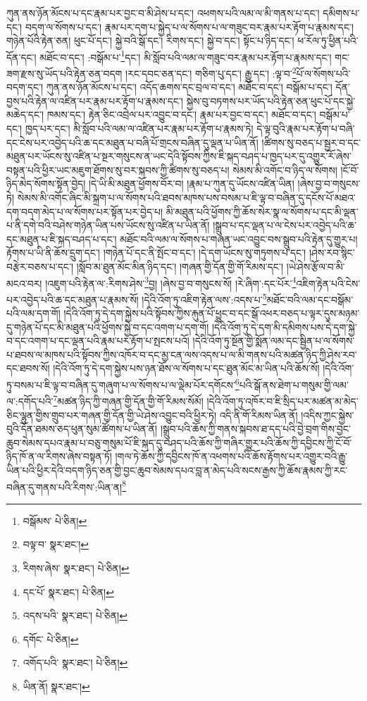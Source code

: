 ཀུན་ནས་ཉོན་མོངས་པ་དང་རྣམ་པར་བྱང་བ་མི་ཤེས་པ་དང་། འཕགས་པའི་ལམ་ལ་མི་གནས་པ་དང་། དམིགས་པ་དང་། བདག་ལ་སོགས་པ་དང་། རྣམ་པར་དག་པ་སྐྱེད་པ་ལ་སོགས་པ་ལ་གཟུང་བར་རྣམ་པར་རྟོག་པ་རྣམས་དང་། གཉེན་པོའི་རྟེན་ཅན། ཕུང་པོ་དང་། སྐྱེ་བའི་སྒོ་དང་། རིགས་དང་། སྐྱེ་བ་དང་། སྟོང་པ་ཉིད་དང་། ཕ་རོལ་ཏུ་ཕྱིན་པའི་དོན་དང་། མཐོང་བ་དང་། :བསྒོམ་པ་\footnote{བསྒོམས་  པེ་ཅིན། }དང་། མི་སློབ་པའི་ལམ་ལ་གཟུང་བར་རྣམ་པར་རྟོག་པ་རྣམས་དང་། གང་ཟག་རྫས་སུ་ཡོད་པའི་རྟེན་ཅན་བདག །རང་དབང་ཅན་དང་། གཅིག་པུ་དང་། རྒྱུ་དང་། :ལྟ་བ་\footnote{བལྟ་བ་  སྣར་ཐང་། }པོ་ལ་སོགས་པའི་བདག་དང་། ཀུན་ནས་ཉོན་མོངས་པ་དང་། འདོད་ཆགས་དང་བྲལ་བ་དང་། མཐོང་བ་དང་། བསྒོམ་པ་དང་། དོན་བྱས་པའི་རྟེན་ལ་འཛིན་པར་རྣམ་པར་རྟོག་པ་རྣམས་དང་། སྐྱེས་བུ་བཏགས་པར་ཡོད་པའི་རྟེན་ཅན་ཕུང་པོ་དང་སྐྱེ་མཆེད་དང་། ཁམས་དང་། རྟེན་ཅིང་འབྲེལ་པར་འབྱུང་བ་དང་། རྣམ་པར་བྱང་བ་དང་། མཐོང་བ་དང་། བསྒོམ་པ་དང་། ཁྱད་པར་དང་། མི་སློབ་པའི་ལམ་ལ་འཛིན་པར་རྣམ་པར་རྟོག་པ་རྣམས་ཏེ། དེ་ལྟ་བུའི་རྣམ་པར་རྟོག་པ་བཞི་དང་ངེས་པར་འབྱེད་པའི་ཆ་དང་མཐུན་པ་བཞི་པོ་གྲངས་བཞིན་དུ་ལྡན་པ་ཡིན་ནོ། །ཚིགས་སུ་བཅད་པ་སྦྱར་བ་དང་མཐུན་པར་ཡོངས་སུ་འཛིན་པ་སྔར་གསུངས་ན་ཡང་དེའི་སྟོབས་ཀྱིས་ཇི་སྐད་བཤད་པ་ཁྱད་པར་དུ་འགྱུར་རོ་ཞེས་བསྟན་པའི་ཕྱིར་ཡང་མཇུག་ཐོགས་སུ་བར་སྐབས་ཀྱི་ཚིགས་སུ་བཅད་པ། སེམས་མི་འགོང་བ་ཉིད་ལ་སོགས། །ངོ་བོ་ཉིད་མེད་སོགས་སྟོན་བྱེད། །དེ་ཡི་མི་མཐུན་ཕྱོགས་བོར་བ། །རྣམ་པ་ཀུན་དུ་ཡོངས་འཛིན་ཡིན། །ཞེས་བྱ་བ་གསུངས་ཏེ། སེམས་མི་འགོང་ཞིང་མི་སྐྲག་པ་ལ་སོགས་པའི་ཐབས་མཁས་པས་བསམ་པ་ཇི་ལྟ་བ་བཞིན་དུ་དངོས་པོ་མཐའ་དག་བདག་མེད་པ་ལ་སོགས་པར་སྟོན་པར་བྱེད་པ། མི་མཐུན་པའི་ཕྱོགས་ཀྱི་ཆོས་སེར་སྣ་ལ་སོགས་པ་དང་མི་ལྡན་པ་ནི་དགེ་བའི་བཤེས་གཉེན་ཡིན་པས་ཡོངས་སུ་འཛིན་པ་ཡིན་ནོ། །སྒྲུབ་པ་དང་ལྡན་པ་ལ་ངེས་པར་འབྱེད་པའི་ཆ་དང་མཐུན་པ་ཇི་སྐད་བཤད་པ་དང་། མཐོང་བའི་ལམ་ལ་སོགས་པ་གཞན་ཡང་འབྱུང་བས་སྒྲུབ་པའི་རྟེན་དུ་གྱུར་པ། རྟོགས་པ་ཡི་ནི་ཆོས་དྲུག་དང་། །གཉེན་པོ་དང་ནི་སྤོང་བ་དང་། །དེ་དག་ཡོངས་སུ་གཏུགས་པ་དང་། །ཤེས་རབ་སྙིང་བརྩེར་བཅས་པ་དང་། །སློབ་མ་ཐུན་མོང་མིན་ཉིད་དང་། །གཞན་གྱི་དོན་གྱི་གོ་རིམས་དང་། །ཡེ་ཤེས་རྩོལ་བ་མི་མངའ་བར། །འཇུག་པའི་རྟེན་ལ་:རིགས་ཤེས་\footnote{རིགས་ཞེས་  སྣར་ཐང་།  པེ་ཅིན། }བྱ། །ཞེས་བྱ་བ་གསུངས་སོ། །རེ་ཞིག་:དང་པོར་\footnote{དང་པོ་  སྣར་ཐང་།  པེ་ཅིན། }འཇིག་རྟེན་པའི་ངེས་པར་འབྱེད་པའི་ཆ་དང་མཐུན་པ་རྣམས་སོ། །དེའི་འོག་ཏུ་འཇིག་རྟེན་ལས་:འདས་པ་\footnote{འདས་པའི་  སྣར་ཐང་།  པེ་ཅིན། }མཐོང་བའི་ལམ་དང་བསྒོམ་པའི་ལམ་དག་གོ། །དེའི་འོག་ཏུ་དེ་དག་སྐྱེས་པའི་སྟོབས་ཀྱིས་རྐུན་པོ་ཕྱུང་བ་དང་སྒོ་འཕར་བཅད་པ་ལྟར་དུས་མཉམ་དུ་གཉེན་པོ་དང་མི་མཐུན་པའི་ཕྱོགས་སྐྱེ་བ་དང་འགག་པ་དག་གོ། །དེའི་འོག་ཏུ་དེ་དག་མི་དམིགས་པས་དེ་དག་སྐྱེ་བ་དང་འགག་པ་དང་ལྡན་པའི་རྣམ་པར་རྟོག་པ་སྤངས་པའོ། །དེའི་འོག་ཏུ་སྔོན་གྱི་སྨོན་ལམ་དང་སྦྱིན་པ་ལ་སོགས་པ་ཐབས་ལ་མཁས་པའི་སྟོབས་ཀྱིས་འཁོར་བ་དང་མྱ་ངན་ལས་འདས་པ་ལ་མི་གནས་པའི་མཚན་ཉིད་ཀྱི་ཤེས་རབ་དང་ཐབས་སོ། །དེའི་འོག་ཏུ་དེ་དག་སྐྱེས་པས་ཉན་ཐོས་ལ་སོགས་པ་དང་ཐུན་མོང་མ་ཡིན་པའི་ཆོས་སོ། །དེའི་འོག་ཏུ་བསམ་པ་ཇི་ལྟ་བ་བཞིན་དུ་གཞུག་པ་ལ་སོགས་པ་ལ་ལྡེམ་པོར་དགོངས་\footnote{དགོང་  པེ་ཅིན། }པའི་སྒོ་ནས་ཐེག་པ་གསུམ་གྱི་ལམ་ལ་:དགོད་པའི་\footnote{འགོད་པའི་  སྣར་ཐང་།  པེ་ཅིན། }མཚན་ཉིད་ཀྱི་གཞན་གྱི་དོན་གྱི་གོ་རིམས་སོམོ། །དེའི་འོག་ཏུ་འཁོར་བ་ཇི་སྲིད་པར་མཚན་མ་མེད་ཅིང་ལྷུན་གྱིས་གྲུབ་པར་གཞན་གྱི་དོན་གྱི་ཡེ་ཤེས་འབྱུང་བའི་ཕྱིར་ཏེ། འདི་ནི་གོ་རིམས་ཡིན་ནོ། །འདིས་ཀྱང་སྐྱེས་བུའི་དོན་ཐམས་ཅད་ཕུན་སུམ་ཚོགས་པ་ཡིན་ནོ། །སྒྲུབ་པའི་ཆོས་ཀྱི་གནས་སྐབས་ཐ་དད་པའི་བྱེ་བྲག་གིས་བྱང་ཆུབ་སེམས་དཔའ་རྣམ་པ་བཅུ་གསུམ་པོ་ཇི་སྐད་དུ་བཤད་པའི་ཆོས་ཀྱི་གཞིར་གྱུར་པའི་ཆོས་ཀྱི་དབྱིངས་ཀྱི་ངོ་བོ་ཉིད་ཁོ་ན་ལ་རིགས་ཞེས་བསྟན་ཏོ། །གལ་ཏེ་ཆོས་ཀྱི་དབྱིངས་ཁོ་ན་འཕགས་པའི་ཆོས་རྟོགས་པར་འགྱུར་བའི་རྒྱུ་ཡིན་པའི་ཕྱིར་དེའི་བདག་ཉིད་ཅན་གྱི་བྱང་ཆུབ་སེམས་དཔའ་བླ་ན་མེད་པའི་སངས་རྒྱས་ཀྱི་ཆོས་རྣམས་ཀྱི་རང་བཞིན་དུ་གནས་པའི་རིགས་:ཡིན་ན།\footnote{ཡིན་ནོ།  སྣར་ཐང་། } 